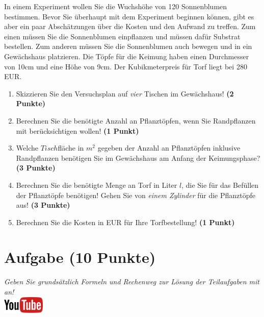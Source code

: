 \documentclass[a4paper, 10pt]{scrartcl}\usepackage[]{graphicx}\usepackage[]{xcolor}
\begin{document}
In einem Experiment wollen Sie die Wuchsh{\"o}he von 120
Sonnenblumen bestimmen. Bevor Sie {\"u}berhaupt mit dem Experiment beginnen
k{\"o}nnen, gibt es aber ein paar Absch{\"a}tzungen {\"u}ber die Kosten und den Aufwand
zu treffen. Zum einen m{\"u}ssen Sie die Sonnenblumen einpflanzen und m{\"u}ssen
daf{\"u}r Substrat bestellen. Zum anderen m{\"u}ssen Sie die Sonnenblumen auch
bewegen und in ein Gew{\"a}chshaus platzieren. Die T{\"o}pfe f{\"u}r die Keimung haben
einen Durchmesser von 10cm und eine H{\"o}he von 9cm. Der
Kubikmeterpreis f{\"u}r Torf liegt bei 280 EUR.

\begin{enumerate}
\item Skizzieren Sie den Versuchsplan auf \textit{vier} Tischen im
  Gew{\"a}chshaus! \textbf{(2 Punkte)}
\item Berechnen Sie die ben{\"o}tigte Anzahl an Pflanzt{\"o}pfen, wenn Sie
  Randpflanzen mit ber{\"u}cksichtigen wollen! \textbf{(1 Punkt)}
\item Welche $Tisch$fl{\"a}che in $m^2$ gegeben der Anzahl an
  Pflanzt{\"o}pfen inklusive Randpflanzen ben{\"o}tigen Sie im Gew{\"a}chshaus am
  Anfang der Keimungsphase?  \textbf{(3 Punkte)}
\item Berechnen Sie die ben{\"o}tigte Menge an Torf in Liter $l$, die Sie f{\"u}r
  das Bef{\"u}llen der Pflanzt{\"o}pfe ben{\"o}tigen! Gehen Sie von \textit{einem
    Zylinder} f{\"u}r die Pflanzt{\"o}pfe aus!  \textbf{(3 Punkte)}
\item Berechnen Sie die Kosten in EUR f{\"u}r Ihre Torfbestellung! \textbf{(1
    Punkt)}
\end{enumerate}



 
\clearpage

\section{Aufgabe \hfill (10 Punkte)}

\textit{Geben Sie grunds{\"a}tzlich Formeln und Rechenweg zur L{\"o}sung der
  Teilaufgaben mit an!} \\[1Ex]

\hfill\href{https://youtu.be/1B53cVFIU7Q}{\includegraphics[width =
  2cm]{img/youtube}} %
\hspace{2Ex}
\end{document}
